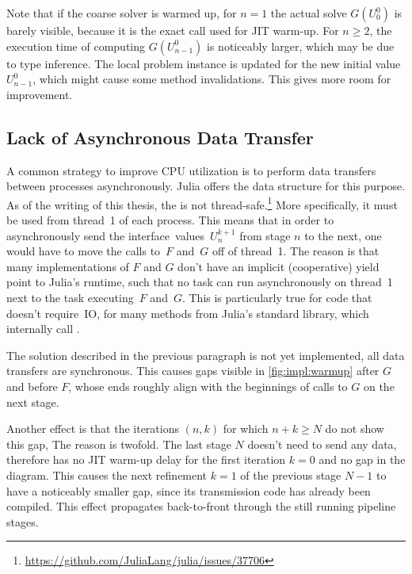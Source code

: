 
Note that if the coarse solver is warmed up,
for $n=1$ the actual solve $G(U_0^0)$ is barely visible,
because it is the exact call used for \ac{JIT} warm-up.
For $n\geq 2$, the execution time of computing $G(U_{n-1}^0)$ is noticeably larger,
which may be due to type inference.
The local problem instance is updated for the new initial value $U_{n-1}^0$,
which might cause some method invalidations.
This gives more room for improvement.

\subsection{Lack of Asynchronous Data Transfer}

A common strategy to improve CPU utilization is to perform data transfers between processes asynchronously.
Julia offers the  data structure for this purpose.
As of the writing of this thesis,
the  is not thread-safe.\footnote{\url{https://github.com/JuliaLang/julia/issues/37706}}
More specifically, it must be used from thread~1 of each process.
This means that in order to asynchronously send the interface~values~$U_n^{k+1}$ from stage $n$ to the next,
one would have to move the calls to~$F$ and~$G$ off of thread~1.
The reason is that many implementations of $F$ and $G$ don't have an implicit (cooperative) yield point to Julia's runtime,
such that no task can run asynchronously on thread~1 next to the task executing~$F$ and~$G$.
This is particularly true for code that doesn't require~\ac{IO},
\eg for many methods from Julia's  standard library,
which internally call .

The solution described in the previous paragraph is not yet implemented,
\ie all data transfers are synchronous.
This causes gaps visible in \autoref{fig:impl:warmup} after $G$ and before $F$,
whose ends roughly align with the beginnings of calls to $G$ on the next stage.

Another effect is that the iterations $(n,k)$ for which $n+k \geq N$ do not show this gap,
The reason is twofold.
The last stage $N$ doesn't need to send any data, therefore has no \ac{JIT} warm-up delay for the first iteration $k=0$ and no gap in the diagram.
This causes the next refinement $k=1$ of the previous stage $N-1$ to have a noticeably smaller gap,
since its transmission code has already been compiled.
This effect propagates back-to-front through the still running pipeline stages.

